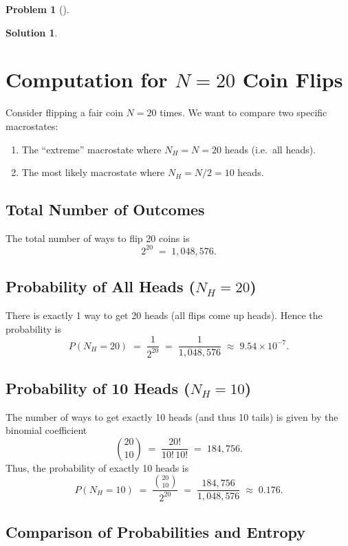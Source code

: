 \documentclass[12pt]{article}
\theoremstyle{definition} %
\newtheorem{solution}{Solution}
\newtheorem{problem}{Problem}
\theoremstyle{plain} %
\begin{document}
\begin{problem}[]
    
\end{problem}
\begin{solution}
    
\section*{Computation for $N=20$ Coin Flips}

Consider flipping a fair coin $N=20$ times. We want to compare two specific 
macrostates:
\begin{enumerate}
  \item The ``extreme'' macrostate where \(\displaystyle N_H = N = 20\) heads 
        (i.e.\ all heads).
  \item The most likely macrostate where \(\displaystyle N_H = N/2 = 10\) heads.
\end{enumerate}

\subsection*{Total Number of Outcomes}

The total number of ways to flip 20 coins is 
\[
2^{20} \;=\; 1{,}048{,}576.
\]

\subsection*{Probability of All Heads (\texorpdfstring{$N_H=20$}{NH=20})}

There is exactly 1 way to get 20 heads (all flips come up heads). 
Hence the probability is
\[
P(N_H = 20) 
\;=\; \frac{1}{2^{20}}
\;=\; \frac{1}{1{,}048{,}576}
\;\approx\; 9.54\times 10^{-7}.
\]

\subsection*{Probability of 10 Heads (\texorpdfstring{$N_H=10$}{NH=10})}

The number of ways to get exactly 10 heads (and thus 10 tails) is 
given by the binomial coefficient
\[
\binom{20}{10}
\;=\; \frac{20!}{10!\,10!}
\;=\; 184{,}756.
\]
Thus, the probability of exactly 10 heads is
\[
P(N_H = 10) 
\;=\; \frac{\binom{20}{10}}{2^{20}}
\;=\; \frac{184{,}756}{1{,}048{,}576}
\;\approx\; 0.176.
\]

\subsection*{Comparison of Probabilities and Entropy}


\end{solution}
\end{document}
